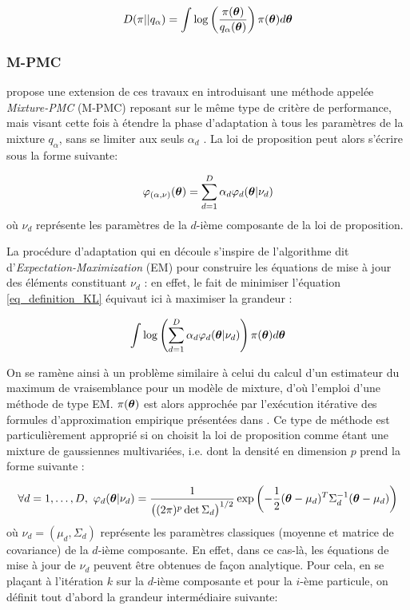 \begin{equation}
D(\pi || q_\alpha ) = \int \log\left(\dfrac{\pi({\bm{\theta}})}{q_\alpha({\bm{\theta}})}\right)\pi({\bm{\theta}})d{\bm{\theta}}
\label{eq_definition_KL}
\end{equation}

\subsubsection{M-PMC}

\cite{Cappe2008} propose une extension de ces travaux en introduisant une méthode appelée \textit{Mixture-PMC} (M-PMC) reposant sur le même type de critère de performance, mais visant cette fois à étendre la phase d'adaptation à tous les paramètres de la mixture $q_{\alpha}$, sans se limiter aux seuls $\alpha_d$ . La loi de proposition peut alors s'écrire sous la forme suivante:

\begin{equation}
{\varphi}_{(\alpha,\nu)}({\bm{\theta}}) = \sum\limits_{d=1}^D\alpha_d {\varphi}_d({\bm{\theta}} |\nu_d)
\label{eq_M_PMC_kernel}
\end{equation}
où $\nu_d$ représente les paramètres de la $d$-ième composante de la loi de proposition.

La procédure d'adaptation qui en découle s'inspire de l'algorithme dit d'\textit{Expectation-Maximization} (EM) pour construire les équations de mise à jour des éléments constituant $\nu_d$ : en effet, le fait de minimiser l'équation \eqref{eq_definition_KL} équivaut ici  à maximiser la grandeur : 

\begin{equation}
\int \log\left(\sum\limits_{d=1}^D \alpha_d {\varphi}_d({\bm{\theta}}| \nu_d)\right)\pi({\bm{\theta}})d{\bm{\theta}}
\label{eq_KL_pour_EM}
\end{equation} 

On se ramène ainsi à un problème similaire à celui du calcul d'un estimateur du maximum de vraisemblance pour un modèle de mixture, d'où l'emploi d'une méthode de type EM. {$\pi({\bm{\theta}})$ est alors approchée par l'exécution itérative des formules d'approximation empirique présentées dans \cite{Cappe2008}.}
Ce type de méthode est particulièrement approprié si on choisit la loi de proposition comme étant une mixture de gaussiennes multivariées, i.e. dont la densité en dimension $p$ prend la forme suivante : 

\begin{equation}
{
\forall d = 1, \dots, D, ~ {\varphi}_d({\bm{\theta}}|\nu_d) = \dfrac{1}{\bigl((2\pi)^p\det \Sigma_d\bigr)^{1/2}}\exp\left(-\dfrac{1}{2}({\bm{\theta}}- \mu_d)^T \Sigma_d^{-1}({\bm{\theta}}- \mu_d)\right)
\label{eq_def_multivariate_gaussian}
}
\end{equation}
où $\nu_d = (\mu_d, \Sigma_d)$ représente les paramètres classiques (moyenne et matrice de covariance) de la $d$-ième composante. En effet, dans ce cas-là, les équations de mise à jour de $\nu_d$ peuvent être obtenues de façon analytique. Pour cela, en se plaçant à l'itération $k$ sur la $d$-ième composante et pour la $i$-ème particule, on définit tout d'abord la grandeur intermédiaire suivante:

